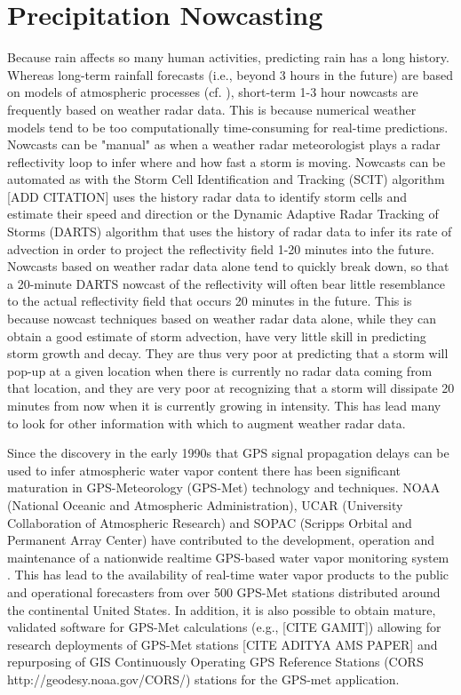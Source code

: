 \documentclass[proposal]{umassthesis}
\begin{document}
\section{Precipitation Nowcasting}

Because rain affects so many human activities, predicting rain has a long history. Whereas long-term rainfall forecasts (i.e., beyond 3 hours in the future) are based on models of atmospheric processes (cf. \cite{lynch2008origins}), short-term 1-3 hour nowcasts are frequently based on weather radar data. This is because numerical weather models tend to be too computationally time-consuming for real-time predictions. Nowcasts can be "manual" as when a weather radar meteorologist plays a radar reflectivity loop to infer where and how fast a storm is moving. Nowcasts can be automated as with the Storm Cell Identification and Tracking (SCIT) algorithm [ADD CITATION] uses the history radar data to identify storm cells and estimate their speed and direction or the Dynamic Adaptive Radar Tracking of Storms (DARTS) algorithm \cite{ruzanski2011casa} that uses the history of radar data to infer its rate of advection in order to project the reflectivity field 1-20 minutes into the future. Nowcasts based on weather radar data alone tend to quickly break down, so that a 20-minute DARTS nowcast of the reflectivity will often bear little resemblance to the actual reflectivity field that occurs 20 minutes in the future. This is because nowcast techniques based on weather radar data alone, while they can obtain a good estimate of storm advection, have very little skill in predicting storm growth and decay. They are thus very poor at predicting that a storm will pop-up at a given location when there is currently no radar data coming from that location, and they are very poor at recognizing that a storm will dissipate 20 minutes from now when it is currently growing in intensity. This has lead many to look for other information with which to augment weather radar data.

Since the discovery in the early 1990s that GPS signal propagation delays can be used to infer atmospheric water vapor content \cite{bevis1992gps} \cite{bevis1994gps} there has been significant maturation in GPS-Meteorology (GPS-Met) technology and techniques. NOAA (National Oceanic and Atmospheric Administration), UCAR (University Collaboration of Atmospheric Research) and SOPAC (Scripps Orbital and Permanent Array Center) have contributed to the development, operation and maintenance of a nationwide realtime GPS-based water vapor monitoring system \cite{wolfe2000developing} \cite{bock1997scripps}. This has lead to the availability of real-time water vapor products to the public and operational forecasters from over 500 GPS-Met stations distributed around the continental United States. In addition, it is also possible to obtain mature, validated software for GPS-Met calculations (e.g., [CITE GAMIT]) allowing for research deployments of GPS-Met stations [CITE ADITYA AMS PAPER] and repurposing of GIS Continuously Operating GPS Reference Stations (CORS http://geodesy.noaa.gov/CORS/) stations for the GPS-met application.
\end{document}
